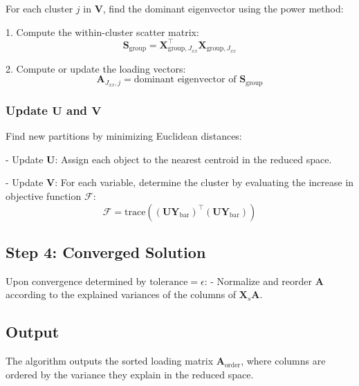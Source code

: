 \documentclass{article}
\begin{document}
For each cluster $j$ in $\bm{V}$, find the dominant eigenvector using the power method:

1. Compute the within-cluster scatter matrix:
   \[
   \bm{S}_{\text{group}} = \bm{X}_{\text{group}, J_{xx}}^\top \bm{X}_{\text{group}, J_{xx}}
   \]

2. Compute or update the loading vectors:
   \[
   \bm{A}_{J_{xx}, j} = \text{dominant eigenvector of } \bm{S}_{\text{group}}
   \]

\subsubsection*{Update $\bm{U}$ and $\bm{V}$}

Find new partitions by minimizing Euclidean distances:

- Update $\bm{U}$: Assign each object to the nearest centroid in the reduced space.

- Update $\bm{V}$: For each variable, determine the cluster by evaluating the increase in objective function $\mathcal{F}$:
  \[
  \mathcal{F} = \text{trace}\left((\bm{U} \bm{Y}_\text{bar})^\top (\bm{U} \bm{Y}_\text{bar})\right)
  \]

\subsection*{Step 4: Converged Solution}
Upon convergence determined by $\text{tolerance} = \epsilon$:
- Normalize and reorder $\bm{A}$ according to the explained variances of the columns of $\bm{X}_s \bm{A}$.

\subsection*{Output}

The algorithm outputs the sorted loading matrix $\bm{A}_{\text{order}}$, where columns are ordered by the variance they explain in the reduced space.
\end{document}
